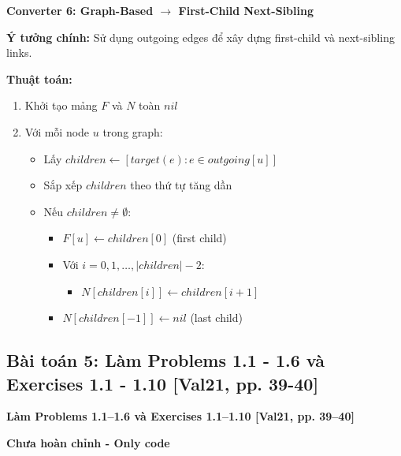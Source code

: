 \documentclass[12pt,a4paper]{article}
\begin{document}
\newpage

\textbf{Converter 6: Graph-Based $\rightarrow$ First-Child Next-Sibling}
\vspace{0.5cm}

\textbf{Ý tưởng chính:} Sử dụng outgoing edges để xây dựng first-child và next-sibling links.

\textbf{Thuật toán:}
\begin{enumerate}
    \item Khởi tạo mảng $F$ và $N$ toàn $nil$
    \item Với mỗi node $u$ trong graph:
    \begin{itemize}
        \item Lấy $children \leftarrow [target(e) : e \in outgoing[u]]$
        \item Sắp xếp $children$ theo thứ tự tăng dần
        \item Nếu $children \neq \emptyset$:
        \begin{itemize}
            \item $F[u] \leftarrow children[0]$ (first child)
            \item Với $i = 0, 1, \ldots, |children| - 2$:
            \begin{itemize}
                \item $N[children[i]] \leftarrow children[i+1]$
            \end{itemize}
            \item $N[children[-1]] \leftarrow nil$ (last child)
        \end{itemize}
    \end{itemize}
\end{enumerate}

\vspace{0.5cm}






\newpage

\subsection{Bài toán 5: Làm Problems 1.1 - 1.6 và Exercises 1.1 - 1.10 [Val21, pp. 39-40]}

\begin{problembox}
    \textbf{Làm Problems 1.1–1.6 và Exercises 1.1–1.10 [Val21, pp. 39–40]} 

\end{problembox}

\textbf{Chưa hoàn chỉnh - Only code}
\end{document}
